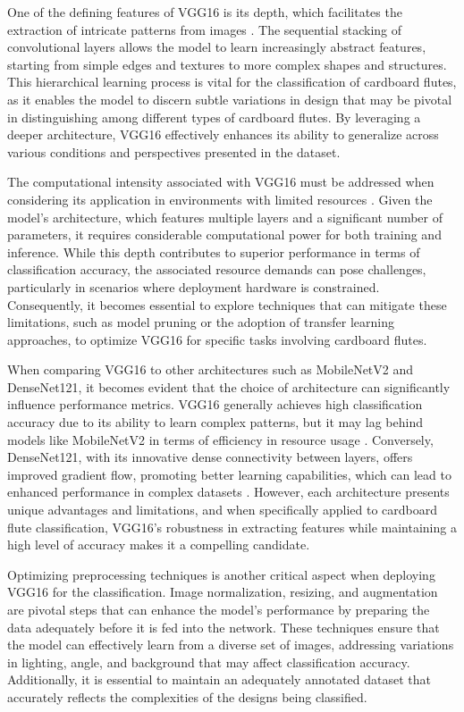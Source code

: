 One of the defining features of VGG16 is its depth, which facilitates the extraction of intricate patterns from images \cite{Simonyan2015}. The sequential stacking of convolutional layers allows the model to learn increasingly abstract features, starting from simple edges and textures to more complex shapes and structures. This hierarchical learning process is vital for the classification of cardboard flutes, as it enables the model to discern subtle variations in design that may be pivotal in distinguishing among different types of cardboard flutes. By leveraging a deeper architecture, VGG16 effectively enhances its ability to generalize across various conditions and perspectives presented in the dataset.


The computational intensity associated with VGG16 must be addressed when considering its application in environments with limited resources \cite{Simonyan2015}. Given the model's architecture, which features multiple layers and a significant number of parameters, it requires considerable computational power for both training and inference. While this depth contributes to superior performance in terms of classification accuracy, the associated resource demands can pose challenges, particularly in scenarios where deployment hardware is constrained. Consequently, it becomes essential to explore techniques that can mitigate these limitations, such as model pruning or the adoption of transfer learning approaches, to optimize VGG16 for specific tasks involving cardboard flutes.


When comparing VGG16 to other architectures such as MobileNetV2 and DenseNet121, it becomes evident that the choice of architecture can significantly influence performance metrics. VGG16 generally achieves high classification accuracy due to its ability to learn complex patterns, but it may lag behind models like MobileNetV2 in terms of efficiency in resource usage \cite{Sandler2018}. Conversely, DenseNet121, with its innovative dense connectivity between layers, offers improved gradient flow, promoting better learning capabilities, which can lead to enhanced performance in complex datasets \cite{huang2017densely}. However, each architecture presents unique advantages and limitations, and when specifically applied to cardboard flute classification, VGG16's robustness in extracting features while maintaining a high level of accuracy makes it a compelling candidate.


Optimizing preprocessing techniques is another critical aspect when deploying VGG16 for the classification. Image normalization, resizing, and augmentation are pivotal steps that can enhance the model's performance by preparing the data adequately before it is fed into the network. These techniques ensure that the model can effectively learn from a diverse set of images, addressing variations in lighting, angle, and background that may affect classification accuracy. Additionally, it is essential to maintain an adequately annotated dataset that accurately reflects the complexities of the designs being classified.



